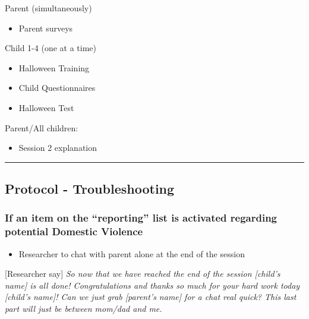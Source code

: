 \documentclass[]{book}
\providecommand{\tightlist}{%
  \setlength{\itemsep}{0pt}\setlength{\parskip}{0pt}}
\begin{document}
Parent (simultaneously)

\begin{itemize}
\tightlist
\item
  Parent surveys
\end{itemize}

Child 1-4 (one at a time)

\begin{itemize}
\tightlist
\item
  Halloween Training
\item
  Child Questionnaires
\item
  Halloween Test
\end{itemize}

Parent/All children:

\begin{itemize}
\tightlist
\item
  Session 2 explanation
\end{itemize}

\begin{center}\rule{0.5\linewidth}{0.5pt}\end{center}

\hypertarget{protocol---troubleshooting}{%
\subsection{Protocol - Troubleshooting}\label{protocol---troubleshooting}}

\hypertarget{if-an-item-on-the-reporting-list-is-activated-regarding-potential-domestic-violence}{%
\subsubsection{If an item on the ``reporting'' list is activated regarding potential Domestic Violence}\label{if-an-item-on-the-reporting-list-is-activated-regarding-potential-domestic-violence}}

\begin{itemize}
\tightlist
\item
  Researcher to chat with parent alone at the end of the session
\end{itemize}

{[}Researcher say{]} \emph{So now that we have reached the end of the session {[}child's name{]} is all done! Congratulations and thanks so much for your hard work today {[}child's name{]}! Can we just grab {[}parent's name{]} for a chat real quick? This last part will just be between mom/dad and me.}
\end{document}
